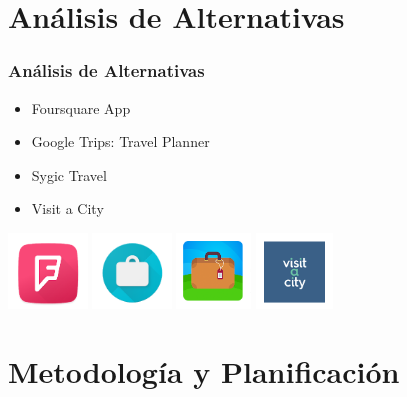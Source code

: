 \documentclass[usenames,dvipsnames]{beamer}
\begin{document}
\section{Análisis de Alternativas}
\begin{frame}
\frametitle{Análisis de Alternativas}

\begin{itemize}
 \item Foursquare App
 \item Google Trips: Travel Planner
 \item Sygic Travel
 \item Visit a City
\end{itemize}


\vspace{0.5cm}
\begin{center}
\includegraphics[height=2cm]{./img/FoursquareApp.png}
\includegraphics[height=2cm]{./img/GoogleTrips.png}
\includegraphics[height=2cm]{./img/SygicTravel.png}
\includegraphics[height=2cm]{./img/VisitaCity.png}

\end{center}
\end{frame}



\section{Metodología y Planificación}
\end{document}
